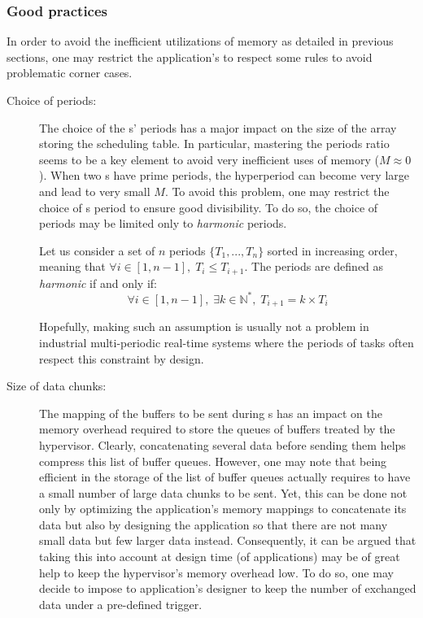 \documentclass[main.tex]{subfiles}
\begin{document}
\subsubsection{Good practices}
\label{sssec_implemExecModel_goodPractices}
In order to avoid the inefficient utilizations of memory as detailed in previous sections, one may restrict the application's to respect some rules to avoid problematic corner cases.
\begin{description}
    \item[Choice of periods: ] The choice of the \PC{}s' periods has a major impact on the size of the array storing the scheduling table. In particular, mastering the periods ratio seems to be a key element to avoid very inefficient uses of memory ($M \approx 0$). When two \PC{}s have prime periods, the hyperperiod can become very large and lead to very small $M$. To avoid this problem, one may restrict the choice of \PC{}s period to ensure good divisibility. To do so, the choice of periods may be limited only to \emph{harmonic} periods.

        \begin{definition}
            Let us consider a set of $n$ periods $\{ T_1, ..., T_n \}$ sorted in increasing order, meaning that $\forall i \in [1, n-1], \; T_i \leq T_{i+1}$. The periods are defined as \emph{harmonic} if and only if:
            \begin{displaymath}
                \forall i \in [1, n-1], \; \exists k \in \mathbb{N}^* , \; T_{i+1} = k \times T_i 
            \end{displaymath}
        \end{definition}

        Hopefully, making such an assumption is usually not a problem in industrial multi-periodic real-time systems where the periods of tasks often respect this constraint by design.

    \item[Size of data chunks: ] The mapping of the buffers to be sent during \PC{}s has an impact on the memory overhead required to store the queues of buffers treated by the hypervisor. Clearly, concatenating several data before sending them helps compress this list of buffer queues. However, one may note that being efficient in the storage of the list of buffer queues actually requires to have a small number of large data chunks to be sent. Yet, this can be done not only by optimizing the application's memory mappings to concatenate its data but also by designing the application so that there are not many small data but few larger data instead. Consequently, it can be argued that taking this into account at design time (of applications) may be of great help to keep the hypervisor's memory overhead low. To do so, one may decide to impose to application's designer to keep the number of exchanged data under a pre-defined trigger.


\end{description}
\end{document}
